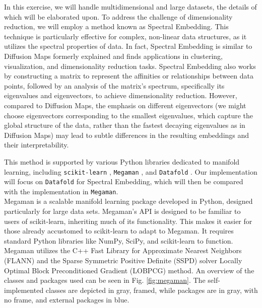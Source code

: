 

In this exercise, we will handle multidimensional and large datasets, the details of which will be elaborated upon. To address the challenge of dimensionality reduction, we will employ a method known as Spectral Embedding. This technique is particularly effective for complex, non-linear data structures, as it utilizes the spectral properties of data. In fact, Spectral Embedding is similar to Diffusion Maps formerly explained and finds applications in clustering, visualization, and dimensionality reduction tasks. Spectral Embedding also works by constructing a matrix to represent the affinities or relationships between data points, followed by an analysis of the matrix's spectrum, specifically its eigenvalues and eigenvectors, to achieve dimensionality reduction. However, compared to Diffusion Maps, the emphasis on different eigenvectors (we might choose eigenvectors corresponding to the smallest eigenvalues, which capture the global structure of the data, rather than the fastest decaying eigenvalues as in Diffusion Maps) may lead to subtle differences in the resulting embeddings and their interpretability.

This method is supported by various Python libraries dedicated to manifold learning, including \texttt{scikit-learn} \cite{pedregosa2011scikit}, \texttt{Megaman} \cite{megaman}, and \texttt{Datafold} \cite{Lehmberg2020}. Our implementation will focus on \texttt{Datafold} for Spectral Embedding, which will then be compared with the implementation in \texttt{Megaman}.\\


Megaman is a scalable manifold learning package developed in Python, designed particularly for large data sets. Megaman's API is designed to be familiar to users of scikit-learn, inheriting much of its functionality. This makes it easier for those already accustomed to scikit-learn to adapt to Megaman. It requires standard Python libraries like NumPy, SciPy, and scikit-learn to function. Megaman utilizes the C++ Fast Library for Approximate Nearest Neighbors (FLANN) and the Sparse Symmetric Positive Definite (SSPD) solver Locally Optimal Block Preconditioned Gradient (LOBPCG) method. An overview of the classes and packages used can be seen in Fig. \ref{fig:megaman}. The self-implemented classes are depicted in gray, framed, while packages are in gray, with no frame, and external packages in blue.

